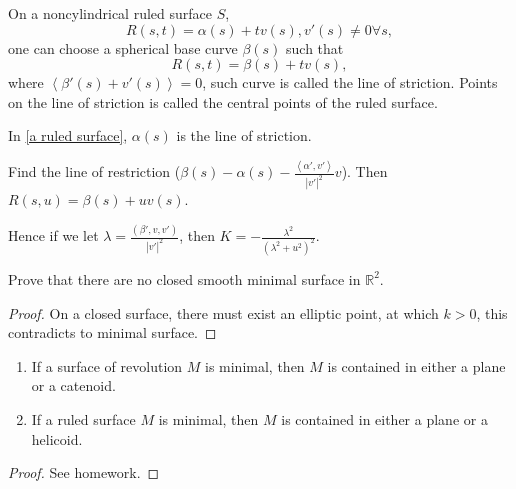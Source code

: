 \begin{remark}
    On a noncylindrical ruled surface \(S\), \ie\ 
    \[R(s,t)=\alpha(s)+t v(s),v'(s)\neq 0\forall s,\]
    one can choose a spherical base curve \(\beta(s)\) such
    that 
    \[
        R(s,t)=\beta(s)+t v(s),    
    \]
    where \(\left\langle\beta'(s)+v'(s)\right\rangle=0\),
     such curve is called the line of striction. Points on the line
      of striction is called the central points of the ruled surface.
\end{remark}
\begin{example}
    In \cref{a ruled surface}, \(\alpha(s)\) is the line of striction.
\end{example}
\begin{exercise}
    Find the line of restriction (\(\beta(s)-\alpha(s)
    -\frac{\left\langle\alpha',v'\right\rangle}{|v'|^2}v\)).
    Then \(R(s,u)=\beta(s)+u v(s)\).

    Hence if we let \(\lambda=\frac{(\beta',v,v')}{|v'|^2}\), then 
    \(K=-\frac{\lambda^2}{\left(\lambda^2+u^2\right)^2}\).
\end{exercise}
\begin{exercise}[Homework]
    Prove that there are no closed smooth minimal surface in 
    \(\mathbb{R}^2\).
\end{exercise}
\begin{proof}
    On a closed surface, there must exist an elliptic point, at which 
    \(k>0\), this contradicts to minimal surface.
\end{proof}
\begin{theorem}
    \begin{enumerate}[(1)]
        \item If a surface of revolution \(M\) is minimal, then 
        \(M\) is contained in either a plane or a catenoid.
        \item If a ruled surface \(M\) is minimal, then \(M\) is 
        contained in either a plane or a helicoid.
    \end{enumerate}
\end{theorem}
\begin{proof}
    See homework.
\end{proof}
